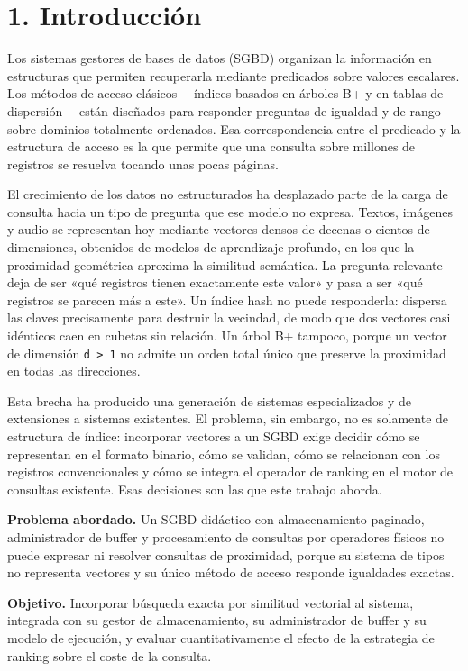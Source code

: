 \documentclass[11pt,a4paper]{article}
\let\subsection\section
\begin{document}
\subsection{1. Introducción}\label{1-introducciuxf3n}

Los sistemas gestores de bases de datos (SGBD) organizan la información
en estructuras que permiten recuperarla mediante predicados sobre
valores escalares. Los métodos de acceso clásicos ---índices basados en
árboles B+ y en tablas de dispersión--- están diseñados para responder
preguntas de igualdad y de rango sobre dominios totalmente ordenados.
Esa correspondencia entre el predicado y la estructura de acceso es la
que permite que una consulta sobre millones de registros se resuelva
tocando unas pocas páginas.

El crecimiento de los datos no estructurados ha desplazado parte de la
carga de consulta hacia un tipo de pregunta que ese modelo no expresa.
Textos, imágenes y audio se representan hoy mediante vectores densos de
decenas o cientos de dimensiones, obtenidos de modelos de aprendizaje
profundo, en los que la proximidad geométrica aproxima la similitud
semántica. La pregunta relevante deja de ser «qué registros tienen
exactamente este valor» y pasa a ser «qué registros se parecen más a
este». Un índice hash no puede responderla: dispersa las claves
precisamente para destruir la vecindad, de modo que dos vectores casi
idénticos caen en cubetas sin relación. Un árbol B+ tampoco, porque un
vector de dimensión \texttt{d\ \textgreater{}\ 1} no admite un orden
total único que preserve la proximidad en todas las direcciones.

Esta brecha ha producido una generación de sistemas especializados y de
extensiones a sistemas existentes. El problema, sin embargo, no es
solamente de estructura de índice: incorporar vectores a un SGBD exige
decidir cómo se representan en el formato binario, cómo se validan, cómo
se relacionan con los registros convencionales y cómo se integra el
operador de ranking en el motor de consultas existente. Esas decisiones
son las que este trabajo aborda.

\textbf{Problema abordado.} Un SGBD didáctico con almacenamiento
paginado, administrador de buffer y procesamiento de consultas por
operadores físicos no puede expresar ni resolver consultas de
proximidad, porque su sistema de tipos no representa vectores y su único
método de acceso responde igualdades exactas.

\textbf{Objetivo.} Incorporar búsqueda exacta por similitud vectorial al
sistema, integrada con su gestor de almacenamiento, su administrador de
buffer y su modelo de ejecución, y evaluar cuantitativamente el efecto
de la estrategia de ranking sobre el coste de la consulta.
\end{document}
